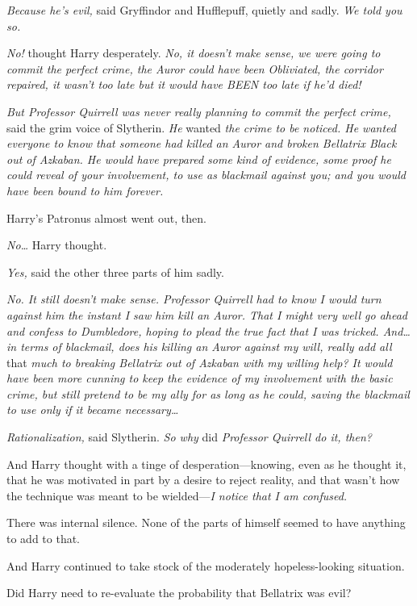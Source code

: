 \emph{Because he's evil,} said Gryffindor and Hufflepuff, quietly and sadly. 
\emph{We told you so.}

\emph{No!} thought Harry desperately. \emph{No, it doesn't make sense, we were 
going to commit the perfect crime, the Auror could have been Obliviated, the 
corridor repaired, it wasn't too late but it would have BEEN too late if he'd 
died!}

\emph{But Professor Quirrell was never really planning to commit the perfect 
crime,} said the grim voice of Slytherin. \emph{He} wanted \emph{the crime to 
be noticed. He wanted everyone to know that someone had killed an Auror and 
broken Bellatrix Black out of Azkaban. He would have prepared some kind of 
evidence, some proof he could reveal of your involvement, to use as blackmail 
against you; and you would have been bound to him forever.}

Harry's Patronus almost went out, then.

\emph{No{\ldots}} Harry thought.

\emph{Yes,} said the other three parts of him sadly.

\emph{No. It still doesn't make sense. Professor Quirrell had to know I would 
turn against him the instant I saw him kill an Auror. That I might very well go 
ahead and confess to Dumbledore, hoping to plead the true fact that I was 
tricked. And{\ldots} in terms of blackmail, does his killing an Auror against 
my will, really add all} that \emph{much to breaking Bellatrix out of Azkaban 
with my willing help? It would have been more cunning to keep the evidence of 
my involvement with the basic crime, but still pretend to be my ally for as 
long as he could, saving the blackmail to use only if it became 
necessary{\ldots}}

\emph{Rationalization,} said Slytherin. \emph{So why} did \emph{Professor 
Quirrell do it, then?}

And Harry thought with a tinge of desperation---knowing, even as he thought it, 
that he was motivated in part by a desire to reject reality, and that wasn't 
how the technique was meant to be wielded---\emph{I notice that I am confused.}

There was internal silence. None of the parts of himself seemed to have 
anything to add to that.

And Harry continued to take stock of the moderately hopeless-looking situation.

Did Harry need to re-evaluate the probability that Bellatrix was evil?

